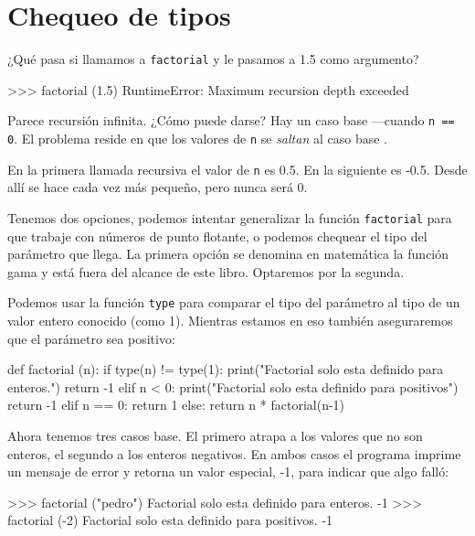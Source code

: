 \section{Chequeo de tipos}

  

¿Qué pasa si llamamos a \texttt{factorial} y le pasamos a 1.5 como
argumento?

\begin{pyconcode}
>>> factorial (1.5)
RuntimeError: Maximum recursion depth exceeded
\end{pyconcode}
 Parece recursión infinita. ¿Cómo puede darse? Hay un caso base —cuando
\texttt{n == 0}. El problema reside en que los valores de \texttt{n}
se {\em saltan} al caso base .

 

En la primera llamada recursiva el valor de \texttt{n} es 0.5. En
la siguiente es -0.5. Desde allí se hace cada vez más pequeño, pero
nunca será 0.

Tenemos dos opciones, podemos intentar generalizar la función \texttt{factorial}
para que trabaje con números de punto flotante, o podemos chequear
el tipo del parámetro que llega. La primera opción se denomina en
matemática la función gama y está fuera del alcance de este libro.
Optaremos por la segunda.


Podemos usar la función \texttt{type} para comparar el tipo del parámetro
al tipo de un valor entero conocido (como 1). Mientras estamos en
eso también aseguraremos que el parámetro sea positivo:

\begin{pythoncode}
def factorial (n):
  if type(n) != type(1):
    print("Factorial solo esta definido para enteros.")
    return -1
  elif n < 0:
    print("Factorial solo esta definido para positivos")
    return -1
  elif n == 0:
    return 1
  else:
    return n * factorial(n-1)
\end{pythoncode}

Ahora tenemos tres casos base. El primero atrapa a los valores que
no son enteros, el segundo a los enteros negativos. En ambos casos
el programa imprime un mensaje de error y retorna un valor especial,
-1, para indicar que algo falló:
\begin{pyconcode}
>>> factorial ("pedro")
Factorial solo esta definido para enteros.
-1
>>> factorial (-2)
Factorial solo esta definido para positivos.
-1
\end{pyconcode}

